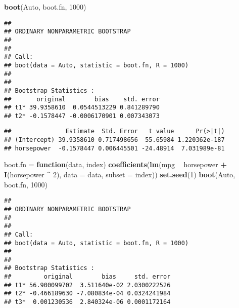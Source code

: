\documentclass[
]{article}
\newenvironment{Shaded}{\begin{snugshade}}{\end{snugshade}}
\newcommand{\ControlFlowTok}[1]{\textcolor[rgb]{0.13,0.29,0.53}{\textbf{#1}}}
\newcommand{\DataTypeTok}[1]{\textcolor[rgb]{0.13,0.29,0.53}{#1}}
\newcommand{\DecValTok}[1]{\textcolor[rgb]{0.00,0.00,0.81}{#1}}
\newcommand{\KeywordTok}[1]{\textcolor[rgb]{0.13,0.29,0.53}{\textbf{#1}}}
\newcommand{\NormalTok}[1]{#1}
\newcommand{\OperatorTok}[1]{\textcolor[rgb]{0.81,0.36,0.00}{\textbf{#1}}}
\newcommand{\StringTok}[1]{\textcolor[rgb]{0.31,0.60,0.02}{#1}}
\begin{document}
\begin{Shaded}
\begin{Highlighting}[]
\KeywordTok{boot}\NormalTok{(Auto, boot.fn, }\DecValTok{1000}\NormalTok{)}
\end{Highlighting}
\end{Shaded}

\begin{verbatim}
## 
## ORDINARY NONPARAMETRIC BOOTSTRAP
## 
## 
## Call:
## boot(data = Auto, statistic = boot.fn, R = 1000)
## 
## 
## Bootstrap Statistics :
##       original        bias    std. error
## t1* 39.9358610  0.0544513229 0.841289790
## t2* -0.1578447 -0.0006170901 0.007343073
\end{verbatim}

\begin{Shaded}
\end{Shaded}

\begin{verbatim}
##               Estimate  Std. Error   t value      Pr(>|t|)
## (Intercept) 39.9358610 0.717498656  55.65984 1.220362e-187
## horsepower  -0.1578447 0.006445501 -24.48914  7.031989e-81
\end{verbatim}

\begin{Shaded}
\begin{Highlighting}[]
\NormalTok{boot.fn =}\StringTok{ }\ControlFlowTok{function}\NormalTok{(data, index)}
  \KeywordTok{coefficients}\NormalTok{(}\KeywordTok{lm}\NormalTok{(mpg }\OperatorTok{~}\StringTok{ }\NormalTok{horsepower }\OperatorTok{+}\StringTok{ }\KeywordTok{I}\NormalTok{(horsepower }\OperatorTok{^}\StringTok{ }\DecValTok{2}\NormalTok{), }\DataTypeTok{data =}\NormalTok{ data, }\DataTypeTok{subset =}\NormalTok{ index))}
\KeywordTok{set.seed}\NormalTok{(}\DecValTok{1}\NormalTok{)}
\KeywordTok{boot}\NormalTok{(Auto, boot.fn, }\DecValTok{1000}\NormalTok{)}
\end{Highlighting}
\end{Shaded}

\begin{verbatim}
## 
## ORDINARY NONPARAMETRIC BOOTSTRAP
## 
## 
## Call:
## boot(data = Auto, statistic = boot.fn, R = 1000)
## 
## 
## Bootstrap Statistics :
##         original        bias     std. error
## t1* 56.900099702  3.511640e-02 2.0300222526
## t2* -0.466189630 -7.080834e-04 0.0324241984
## t3*  0.001230536  2.840324e-06 0.0001172164
\end{verbatim}
\end{document}
